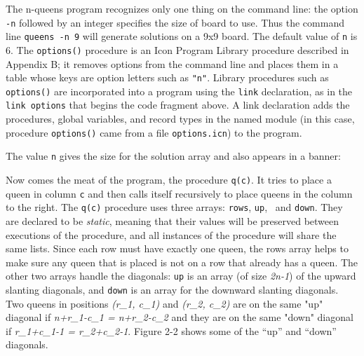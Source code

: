 The n-queens program recognizes only one thing on the command line: the
option \texttt{{}-n} followed by an integer specifies the size of board
to use. Thus the command line \texttt{queens -n 9} will generate
solutions on a 9x9 board. The default value of \texttt{n} is 6. The
\texttt{options()} procedure is an Icon Program
Library procedure described in Appendix B; it removes options from the
command line and places them in a table whose keys are option letters
such as \texttt{"n"}. Library procedures
such as \texttt{options()} are incorporated into a program using the
\texttt{link} declaration, as in the \texttt{link options}
that begins the code fragment above. A link declaration adds the
procedures, global variables, and record types in the named module (in
this case, procedure \texttt{options()} came from a file
\texttt{options.icn}) to the program.


The value \texttt{n} gives the size for the solution array and also
appears in a banner:


Now comes the meat of the program, the procedure \texttt{q(c)}. It tries
to place a queen in column \texttt{c} and then calls itself recursively
to place queens in the column to the right. The \texttt{q(c)} procedure
uses three arrays: \texttt{rows}, \texttt{up}, \ and \texttt{down}.
They are declared to be \textit{static}, meaning that their values will
be preserved between executions of the procedure, and all
instances of the procedure will share the same lists.
Since each row must have exactly one queen, the rows array helps to
make sure any queen that is placed is not on a row that already has a
queen. The other two arrays handle the diagonals: \texttt{up} is an
array (of size \textit{2n-1}) of the upward slanting diagonals, and
\texttt{down} is an array for the downward slanting diagonals. Two
queens in positions \textit{(r\_1, c\_1)} and \textit{(r\_2, c\_2)} are
on the same "up" diagonal if
\textit{n+r\_1-c\_1 = n+r\_2-c\_2} and they are on the same
"down" diagonal if \textit{r\_1+c\_1-1 =
r\_2+c\_2-1}. Figure 2-2 shows some of the
``up'' and ``down'' diagonals.

